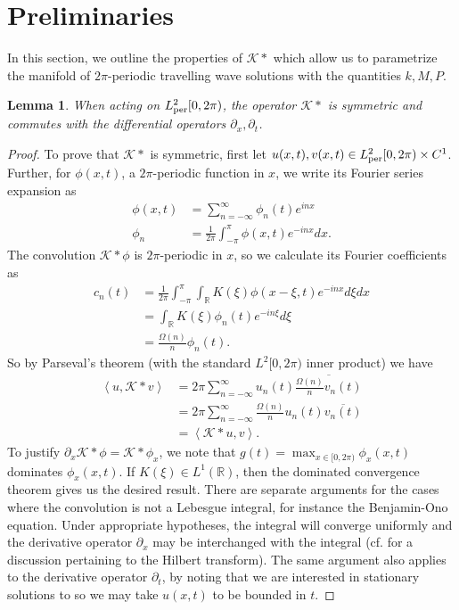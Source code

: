 \documentclass[11pt,leqno]{article}
\numberwithin{equation}{section}
\renewcommand\d{\partial}
\newcommand{\R}{\mathbb R}
\newcommand\LA{\left\langle}
\newcommand\RA{\right\rangle}
\newtheorem{lemma}[theorem]{Lemma}
\theoremstyle{definition}
\begin{document}
\section{Preliminaries}\label{S:prelim}
In this section, we outline the properties of $ \mathcal{K}* $ which allow us to parametrize the manifold of $ 2\pi $-periodic travelling wave solutions with the quantities $ k,M,P $.
\begin{lemma}\label{L:Kprop}
When acting on $ L^2_{\rm per}[0,2\pi) $, the operator $\mathcal{K}*$ is symmetric and commutes with the differential operators $\d_x,\d_{t}$.
\end{lemma}
\begin{proof}
	To prove that $ \mathcal{K}* $ is symmetric, first let $ u(x,t),v(x,t) \in L^{2}_{\rm per}[0,2\pi)\times C^{1}$. Further, for $ \phi(x,t) $, a $ 2\pi $-periodic function in $ x $,  we write its Fourier series expansion as
	\begin{align*}
		\phi(x,t) &= \sum_{n=-\infty}^{\infty}\phi_{n}(t)e^{inx}\\
		\phi_{n} &= \frac{1}{2\pi}\int_{-\pi}^{\pi}\phi(x,t)e^{-inx}dx.
	\end{align*}
	The convolution $ \mathcal{K}*\phi $ is $ 2\pi $-periodic in $ x $, so we calculate its Fourier coefficients as
	\begin{align*}
		c_{n}(t) &= \frac{1}{2\pi}\int_{-\pi}^{\pi}\int_{\R}K(\xi)\phi(x-\xi,t)e^{-inx}d\xi dx\\
		&= \int_{\R}K(\xi)\phi_{n}(t)e^{-in\xi}d\xi\\
		&= \frac{\Omega(n)}{n}\phi_{n}(t).
	\end{align*}
	So by Parseval's theorem (with the standard $ L^{2}[0,2\pi) $ inner product) we have
	\begin{align*}
		\LA u,\mathcal{K}*v \RA &= 2\pi\sum_{n=-\infty}^{\infty}u_{n}(t)\overline{\frac{\Omega(n)}{n}v_{n}(t)}\\
		&= 2\pi\sum_{n=-\infty}^{\infty}\frac{\Omega(n)}{n}u_{n}(t)\overline{v_{n}(t)}\\
		&= \LA \mathcal{K}*u,v \RA.
	\end{align*}
	To justify $ \partial_{x}\mathcal{K}*\phi = \mathcal{K}*\phi_{x} $, we note that $ g(t) = \max_{x\in[0,2\pi)}\phi_{x}(x,t) $ dominates $ \phi_{x}(x,t) $. If $ K(\xi) \in L^{1}(\R) $, then the dominated convergence theorem gives us the desired result. There are separate arguments for the cases where the convolution is not a Lebesgue integral, for instance the Benjamin-Ono equation. Under appropriate hypotheses, the integral will converge uniformly and the derivative operator $ \partial_{x} $ may be interchanged with the integral (cf. \cite{King09} for a discussion pertaining to the Hilbert transform). The same argument also applies to the derivative operator $ \partial_{t} $, by noting that we are interested in stationary solutions to   so we may take $ u(x,t) $ to be bounded in $ t $.
\end{proof}
\end{document}

